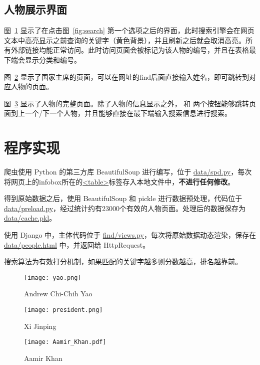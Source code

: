 \documentclass[a4paper]{article}
\begin{document}
\subsection{人物展示界面}

图~\ref{fig:yao} 显示了在点击图~\ref{fig:search} 第一个选项之后的界面，此时搜索引擎会在网页文本中高亮显示之前查询的关键字（黄色背景），并且刷新之后就会取消高亮。所有外部链接均能正常访问。此时访问页面会被标记为该人物的编号，并且在表格最下端会显示分类和编号。

图~\ref{fig:xjp} 显示了国家主席的页面，可以在网址的find后面直接输入姓名，即可跳转到对应人物的页面。

图~\ref{fig:comp} 显示了人物的完整页面。除了人物的信息显示之外， 和  两个按钮能够跳转页面到上一个/下一个人物，并且能够直接在最下端输入搜索信息进行搜索。

\section{程序实现}

爬虫使用 Python 的第三方库 BeautifulSoup 进行编写，位于 \uline{data/spd.py}，每次将网页上的infobox所在的\uline{<table>}标签存入本地文件中，{\bf 不进行任何修改}。

得到原始数据之后，使用 BeautifulSoup 和 pickle 进行数据预处理，代码位于 \uline{data/preload.py}，经过统计约有23000个有效的人物页面。处理后的数据保存为 \uline{data/cache.pkl}。

使用 Django 中，主体代码位于 \uline{find/views.py}，每次将原始数据动态渲染，保存在 \uline{data/people.html} 中，并返回给 HttpRequest。

搜索算法为有效打分机制，如果匹配的关键字越多则分数越高，排名越靠前。

\begin{figure}[htp]
\centering
\texttt{[image: yao.png]}
\caption{Andrew Chi-Chih Yao}
\label{fig:yao}
\end{figure}

\begin{figure}[htp]
\centering
\texttt{[image: president.png]}
\caption{Xi Jinping}
\label{fig:xjp}
\end{figure}

\begin{figure}[htp]
\centering
\texttt{[image: Aamir\_Khan.pdf]}
\caption{Aamir Khan}
\label{fig:comp}
\end{figure}
\end{document}
